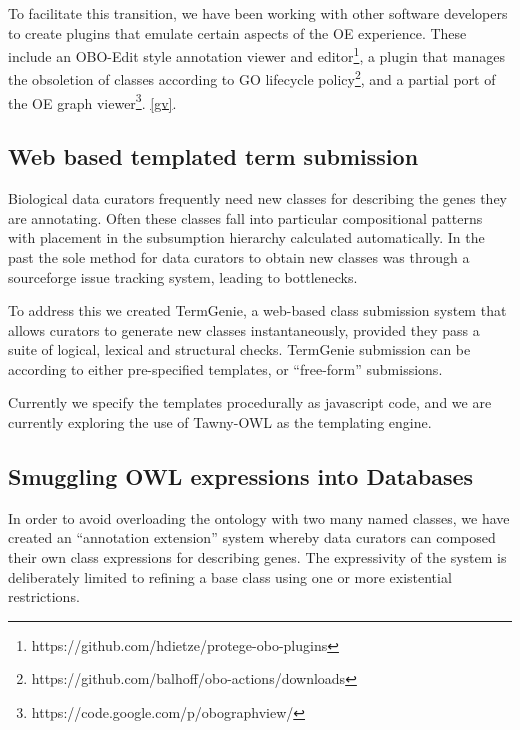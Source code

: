 \documentclass{llncs}
\begin{document}
To facilitate this transition, we have been working with other
software developers to create plugins that emulate certain aspects of
the OE experience. These include an OBO-Edit style annotation viewer and
editor\footnote{https://github.com/hdietze/protege-obo-plugins}, a
plugin that manages the obsoletion of classes according to GO
lifecycle policy\footnote{https://github.com/balhoff/obo-actions/downloads}, and a partial
port of the OE graph
viewer\footnote{https://code.google.com/p/obographview/}.
\ref{gv}.

\subsection{Web based templated term submission}

Biological data curators frequently need new classes for describing
the genes they are annotating. Often these classes fall into
particular compositional patterns with placement in the subsumption
hierarchy calculated automatically. In the past the sole method for
data curators to obtain new classes was through a sourceforge issue
tracking system, leading to bottlenecks.

To address this we created TermGenie\cite{Dietze2014}, a web-based
class submission system that allows curators to generate new classes
instantaneously, provided they pass a suite of logical, lexical and
structural checks. TermGenie submission can be according to either
pre-specified templates, or ``free-form'' submissions.

Currently we specify the templates procedurally as javascript code,
and we are currently exploring the use of Tawny-OWL\cite{Tawny} as the
templating engine.


\subsection{Smuggling OWL expressions into Databases}

In order to avoid overloading the ontology with two many named
classes, we have created an ``annotation extension'' system whereby
data curators can composed their own class expressions for describing
genes\cite{Huntley2014}. The expressivity of the system is
deliberately limited to refining a base class using one or more
existential restrictions.
\end{document}
